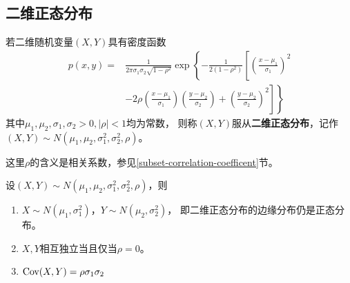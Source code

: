\subsection{二维正态分布}
\begin{definition}[二维正态分布]
  若二维随机变量$(X,Y)$具有密度函数
  \begin{align*}
    p(x,y)=&\frac{1}{2\pi\sigma_1\sigma_2\sqrt{1-\rho^2}}
      \exp\left\{-\frac{1}{2(1-\rho^2)}\left[
        \left(\frac{x-\mu_1}{\sigma_1}\right)^2\right.\right.\\
        &\left.\left.-2\rho\left(\frac{x-\mu_1}{\sigma_1}\right)
          \left(\frac{y-\mu_2}{\sigma_2}\right)
        +\left(\frac{y-\mu_2}{\sigma_2}\right)^2\right]\right\}
  \end{align*}
  其中$\mu_1,\mu_2,\sigma_1,\sigma_2 > 0, |\rho| < 1$均为常数，
  则称$(X,Y)$服从\textbf{二维正态分布}，记作
  $(X,Y)\sim N(\mu_1,\mu_2,\sigma_1^2,\sigma_2^2,\rho)$。
\end{definition}

\begin{remark}
  这里$\rho$的含义是相关系数，参见\ref{subset-correlation-coefficent}节。
\end{remark}

\begin{theorem}[二维正态分布的性质]
  设$(X,Y)\sim N(\mu_1,\mu_2,\sigma_1^2,\sigma_2^2,\rho)$，则
  \begin{enumerate}
    \item 
    $X\sim N(\mu_1,\sigma_1^2)$，$Y\sim N(\mu_2,\sigma_2^2)$，
    即二维正态分布的边缘分布仍是正态分布。
    \item 
    $X,Y$相互独立当且仅当$\rho = 0$。
    \item 
    $\textrm{Cov}(X,Y) = \rho\sigma_1\sigma_2$
  \end{enumerate}
\end{theorem}
